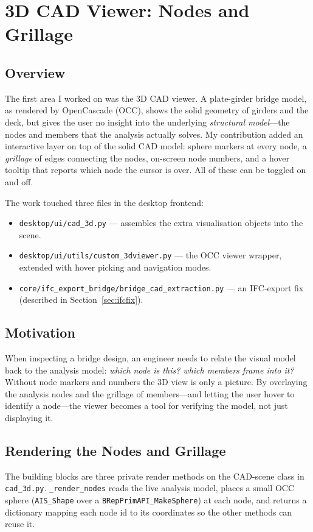 \chapter{3D CAD Viewer: Nodes and Grillage}
\label{ch:cad}

\section{Overview}
The first area I worked on was the 3D CAD viewer. A plate-girder bridge model, as rendered by
OpenCascade (OCC), shows the solid geometry of girders and the deck, but gives the user no
insight into the underlying \emph{structural model}---the nodes and members that the analysis
actually solves. My contribution added an interactive layer on top of the solid CAD model:
sphere markers at every node, a \emph{grillage} of edges connecting the nodes, on-screen node
numbers, and a hover tooltip that reports which node the cursor is over. All of these can be
toggled on and off.

The work touched three files in the desktop frontend:
\begin{itemize}[leftmargin=1.4em]
  \item \texttt{desktop/ui/cad\_3d.py} --- assembles the extra visualisation objects into the
        scene.
  \item \texttt{desktop/ui/utils/custom\_3dviewer.py} --- the OCC viewer wrapper, extended with
        hover picking and navigation modes.
  \item \texttt{core/ifc\_export\_bridge/bridge\_cad\_extraction.py} --- an IFC-export fix
        (described in Section~\ref{sec:ifcfix}).
\end{itemize}

\section{Motivation}
When inspecting a bridge design, an engineer needs to relate the visual model back to the
analysis model: \emph{which node is this? which members frame into it?} Without node markers
and numbers the 3D view is only a picture. By overlaying the analysis nodes and the grillage
of members---and letting the user hover to identify a node---the viewer becomes a tool for
verifying the model, not just displaying it.

\section{Rendering the Nodes and Grillage}
The building blocks are three private render methods on the CAD-scene class in
\texttt{cad\_3d.py}. \texttt{\_render\_nodes} reads the live analysis model, places a small
OCC sphere (\texttt{AIS\_Shape} over a \texttt{BRepPrimAPI\_MakeSphere}) at each node, and
returns a dictionary mapping each node id to its coordinates so the other methods can reuse it.

